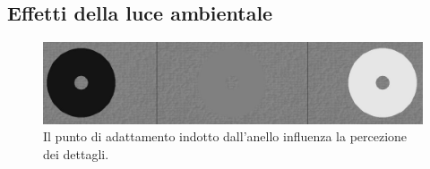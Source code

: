 \documentclass[a4paper,11pt]{article}
\begin{document}
\subsection{Effetti della luce ambientale}

\renewcommand{\thefigure}{2.12}
\begin{figure}[!h]
  \centering
    \includegraphics[scale=0.3]{images/2/circles.png}
    \caption{Il punto di adattamento indotto dall'anello influenza la percezione dei dettagli.}
\end{figure}
\end{document}
